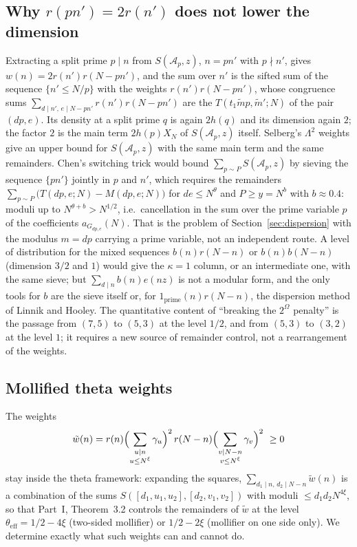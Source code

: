 \documentclass[11pt]{amsart}
\theoremstyle{remark}
\newcommand{\cA}{\mathcal{A}}
\begin{document}
\subsection{Why $r(pn')=2r(n')$ does not lower the dimension}
Extracting a split prime $p\mid n$ from $S(\cA_p,z)$, $n=pn'$ with $p\nmid n'$, gives $w(n)=2r(n')r(N-pn')$, and the sum over $n'$ is the sifted sum of the sequence $\{n'\le N/p\}$ with the weights $r(n')r(N-pn')$, whose congruence sums $\sum_{d\mid n',\,e\mid N-pn'}r(n')r(N-pn')$ are the $T(t_1\tilde mp,\tilde m';N)$ of the pair $(dp,e)$. Its density at a split prime $q$ is again $2h(q)$ and its dimension again $2$; the factor $2$ is the main term $2h(p)X_N$ of $S(\cA_p,z)$ itself. Selberg's $\Lambda^2$ weights give an upper bound for $S(\cA_p,z)$ with the same main term and the same remainders. Chen's switching trick would bound $\sum_{p\sim P}S(\cA_p,z)$ by sieving the sequence $\{pn'\}$ jointly in $p$ and $n'$, which requires the remainders $\sum_{p\sim P}\bigl(T(dp,e;N)-M(dp,e;N)\bigr)$ for $de\le N^{\theta}$ and $P\ge y=N^b$ with $b\approx0.4$: moduli up to $N^{\theta+b}>N^{1/2}$, i.e.\ cancellation in the sum over the prime variable $p$ of the coefficients $a_{G_{dp,e}}(N)$. That is the problem of Section~\ref{sec:dispersion} with the modulus $m=dp$ carrying a prime variable, not an independent route. A level of distribution for the mixed sequences $b(n)r(N-n)$ or $b(n)b(N-n)$ (dimension $3/2$ and $1$) would give the $\kappa=1$ column, or an intermediate one, with the same sieve; but $\sum_{d\mid n}b(n)e(nz)$ is not a modular form, and the only tools for $b$ are the sieve itself or, for $1_{\mathrm{prime}}(n)r(N-n)$, the dispersion method of Linnik and Hooley. The quantitative content of ``breaking the $2^\Omega$ penalty'' is the passage from $(7,5)$ to $(5,3)$ at the level $1/2$, and from $(5,3)$ to $(3,2)$ at the level $1$; it requires a new source of remainder control, not a rearrangement of the weights.

\subsection{Mollified theta weights}\label{subsec:moll}
The weights
\begin{equation}\label{eq:moll}
\tilde w(n)=r(n)\Bigl(\sum_{\substack{u\mid n\\ u\le N^\xi}}\gamma_u\Bigr)^2\,r(N-n)\Bigl(\sum_{\substack{v\mid N-n\\ v\le N^\xi}}\gamma_v\Bigr)^2\ \ge0
\end{equation}
stay inside the theta framework: expanding the squares, $\sum_{d_1\mid n,\,d_2\mid N-n}\tilde w(n)$ is a combination of the sums $S([d_1,u_1,u_2],[d_2,v_1,v_2])$ with moduli $\le d_1d_2N^{4\xi}$, so that Part~I, Theorem~3.2 controls the remainders of $\tilde w$ at the level $\theta_{\mathrm{eff}}=1/2-4\xi$ (two-sided mollifier) or $1/2-2\xi$ (mollifier on one side only). We determine exactly what such weights can and cannot do.
\end{document}
